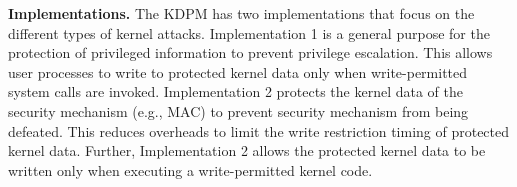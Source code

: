 

{\bf Implementations.}
The KDPM has two implementations that focus on the different types of kernel
attacks.
%
Implementation 1 is a general purpose for the protection of privileged
information to prevent privilege escalation. This allows user processes to write
to protected kernel data only when write-permitted system calls are invoked.
%
Implementation 2 protects the kernel data of the security mechanism (e.g., MAC)
to prevent security mechanism from being defeated. This reduces overheads to
limit the write restriction timing of protected kernel data.
Further, Implementation 2 allows the protected kernel data to be written only
when executing a write-permitted kernel code.

